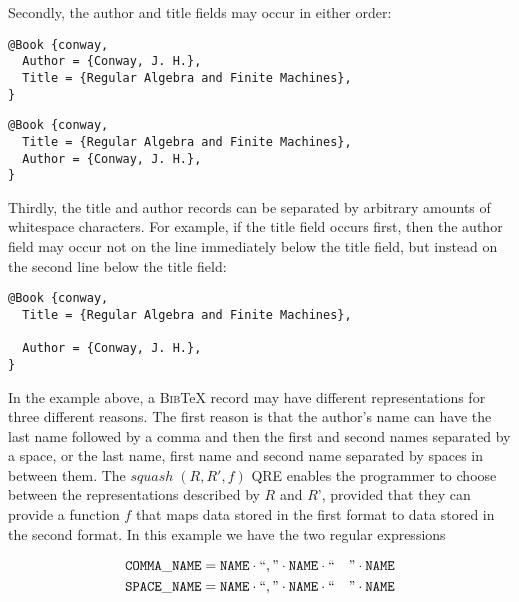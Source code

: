 \documentclass{svproc}
\newcommand{\squash}[3]{\ensuremath{\mathit{squash} \; (#1, #2, #3)}}
\newcommand{\bibtex}{\textsc{Bib}\TeX{}}
\begin{document}
Secondly, the author and title fields may occur in either order:
\begin{verbatim}
@Book {conway,
  Author = {Conway, J. H.},
  Title = {Regular Algebra and Finite Machines},
}
\end{verbatim}
\begin{verbatim}
@Book {conway,
  Title = {Regular Algebra and Finite Machines},
  Author = {Conway, J. H.},
}
\end{verbatim}
Thirdly, the title and author records can be separated by arbitrary amounts of
whitespace characters. For example, if the title field occurs first, then the
author field may occur not on the line immediately below the title field, but
instead on the second line below the title field:
\begin{verbatim}
@Book {conway,
  Title = {Regular Algebra and Finite Machines},
  
  Author = {Conway, J. H.},
}
\end{verbatim}
In the example above, a \bibtex{} record may have different
representations for three different reasons. The first reason
is that the author's name can have the last name followed by a comma and then
the first and second names separated by a space, or the last name, first name and
second name separated by spaces in between them. The $\squash{R}{R'}{f}$ QRE
enables the programmer to choose between the representations described by $R$
and $R$', provided that they can provide a function $f$ that maps data stored in
the first format to data stored in the second format. In this example we have
the two regular expressions

\begin{align*}
  \mathtt{COMMA\_NAME} &= \mathtt{NAME} \cdot ``," \cdot \mathtt{NAME} \cdot ``
                         \quad " \cdot \mathtt{NAME}\\
  \mathtt{SPACE\_NAME} &= \mathtt{NAME} \cdot ``," \cdot \mathtt{NAME} \cdot ``
                         \quad " \cdot \mathtt{NAME}\\
\end{align*}
\end{document}
